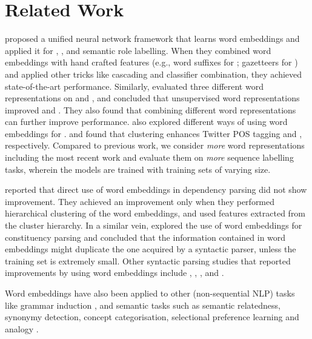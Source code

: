 \section{Related Work}

 proposed a unified neural network framework
that learns word embeddings and applied it for \pos, \chunking, \ner and semantic role labelling. 
When they combined word embeddings with hand crafted features
(e.g., word suffixes for \pos;  gazetteers for \ner) and applied other
tricks like cascading and classifier combination, they achieved state-of-the-art performance.
Similarly,  evaluated three different word representations on \ner and \chunking, and concluded that unsupervised word representations improved \ner and \chunking. They also found that combining different word representations can further improve performance.  also explored different ways of using word embeddings for \ner.   and  found that \brown clustering enhances Twitter POS tagging and \mwe, respectively. Compared to previous work, we consider \textit{more} word representations including the most recent work and evaluate them on \textit{more} sequence labelling tasks, wherein the models are trained with training sets of varying size.

 reported that direct use of word embeddings in dependency parsing did not show improvement. They achieved an improvement only when they performed hierarchical clustering of the word embeddings, and used features extracted from the cluster hierarchy.
In a similar vein,  explored the use of word embeddings for constituency parsing and concluded that the
information contained in word embeddings might duplicate the one acquired by a
syntactic parser, unless the training set is extremely small.
Other syntactic parsing studies that reported improvements by using
word embeddings include , ,
,  and .

Word embeddings have also been applied to other (non-sequential NLP)
tasks like grammar induction \cite{Spitkovsky:2011}, and semantic tasks
such as semantic relatedness, synonymy detection, concept
categorisation, selectional preference learning and analogy \cite{baroni:2014,Levy:2014,Levy:2015}.

